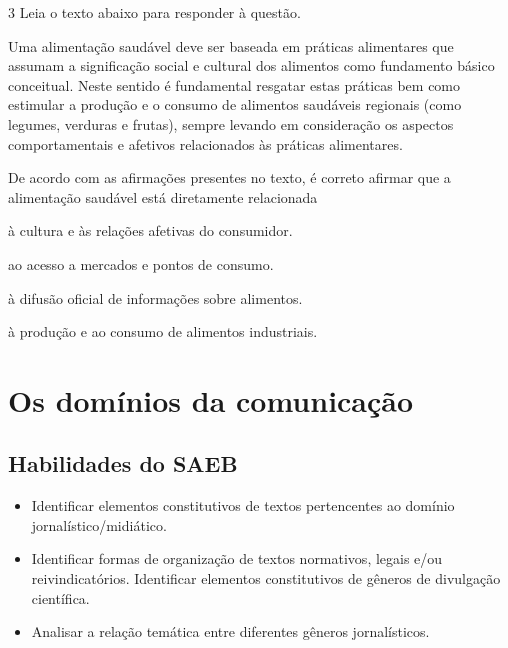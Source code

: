 \num{3} Leia o texto abaixo para responder à questão.

\begin{myquote}

Uma alimentação saudável deve ser baseada em práticas alimentares que
assumam a significação social e cultural dos alimentos como fundamento
básico conceitual. Neste sentido é fundamental resgatar estas práticas
bem como estimular a produção e o consumo de alimentos saudáveis
regionais (como legumes, verduras e frutas), sempre levando em
consideração os aspectos comportamentais e afetivos relacionados às
práticas alimentares.

\end{myquote}


De acordo com as afirmações presentes no texto, é correto afirmar que a alimentação saudável
está diretamente relacionada

\begin{escolha}

  \item à cultura e às relações afetivas do consumidor.
  
  \item ao acesso a mercados e pontos de consumo.
  
  \item à difusão oficial de informações sobre alimentos.
  
  \item à produção e ao consumo de alimentos industriais.

\end{escolha}

\chapter{Os domínios da comunicação}

\section{Habilidades do SAEB}

\begin{itemize}

  \item Identificar elementos constitutivos de textos pertencentes ao
domínio jornalístico/midiático.

  \item Identificar formas de organização de textos normativos, legais e/ou
reivindicatórios. Identificar elementos constitutivos de gêneros de
divulgação científica.

  \item Analisar a relação temática entre diferentes gêneros jornalísticos.

\end{itemize}

